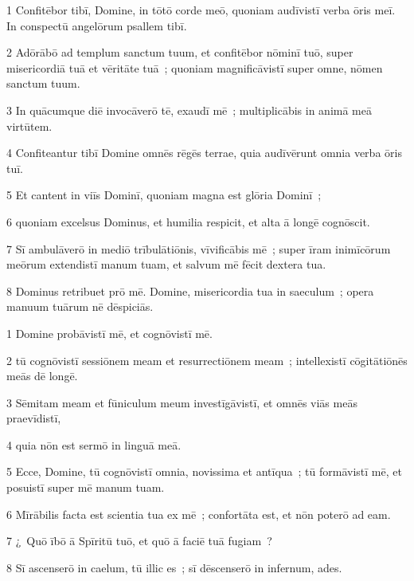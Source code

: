 \psalmVerse
  {\phantom{00}1}
  {Confitēbor tibī, Domine, in tōtō corde meō, quoniam audīvistī verba ōris meī. In conspectū angelōrum psallem tibī.}


\psalmVerse
  {\phantom{00}2}
  {Adōrābō ad templum sanctum tuum, et confitēbor nōminī tuō, super misericordiā tuā et vēritāte tuā~; quoniam magnificāvistī super omne, nōmen sanctum tuum.}


\psalmVerse
  {\phantom{00}3}
  {In quācumque diē invocāverō tē, exaudī mē~; multiplicābis in animā meā virtūtem.}


\psalmVerse
  {\phantom{00}4}
  {Confiteantur tibī Domine omnēs rēgēs terrae, quia audīvērunt omnia verba ōris tuī.}


\psalmVerse
  {\phantom{00}5}
  {Et cantent in viīs Dominī, quoniam magna est glōria Dominī~;}


\psalmVerse
  {\phantom{00}6}
  {quoniam excelsus Dominus, et humilia respicit, et alta ā longē cognōscit.}


\psalmVerse
  {\phantom{00}7}
  {Sī ambulāverō in mediō trībulātiōnis, vīvificābis mē~; super īram inimīcōrum meōrum extendistī manum tuam, et salvum mē fēcit dextera tua.}


\psalmVerse
  {\phantom{00}8}
  {Dominus retribuet prō mē. Domine, misericordia tua in saeculum~; opera manuum tuārum nē dēspiciās.}



\psalmVerse
  {\phantom{00}1}
  {Domine probāvistī mē, et cognōvistī mē.}


\psalmVerse
  {\phantom{00}2}
  {tū cognōvistī sessiōnem meam et resurrectiōnem meam~; intellexistī cōgitātiōnēs meās dē longē.}


\psalmVerse
  {\phantom{00}3}
  {Sēmitam meam et fūniculum meum investīgāvistī, et omnēs viās meās praevīdistī,}


\psalmVerse
  {\phantom{00}4}
  {quia nōn est sermō in linguā meā.}


\psalmVerse
  {\phantom{00}5}
  {Ecce, Domine, tū cognōvistī omnia, novissima et antīqua~; tū formāvistī mē, et posuistī super mē manum tuam.}


\psalmVerse
  {\phantom{00}6}
  {Mīrābilis facta est scientia tua ex mē~; confortāta est, et nōn poterō ad eam.}


\psalmVerse
  {\phantom{00}7}
  {¿~Quō ībō ā Spīritū tuō, et quō ā faciē tuā fugiam~?}


\psalmVerse
  {\phantom{00}8}
  {Sī ascenserō in caelum, tū illic es~; sī dēscenserō in infernum, ades.}


